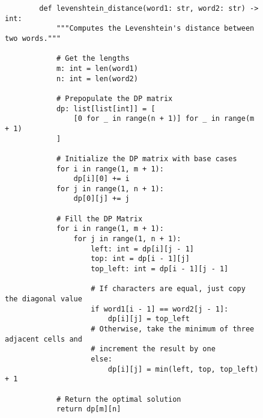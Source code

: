 \begin{figure}[H]
    \centering
    \begin{verbatim}
        def levenshtein_distance(word1: str, word2: str) -> int:
            """Computes the Levenshtein's distance between two words."""

            # Get the lengths
            m: int = len(word1)
            n: int = len(word2)

            # Prepopulate the DP matrix
            dp: list[list[int]] = [
                [0 for _ in range(n + 1)] for _ in range(m + 1)
            ]

            # Initialize the DP matrix with base cases
            for i in range(1, m + 1):
                dp[i][0] += i
            for j in range(1, n + 1):
                dp[0][j] += j

            # Fill the DP Matrix
            for i in range(1, m + 1):
                for j in range(1, n + 1):
                    left: int = dp[i][j - 1]
                    top: int = dp[i - 1][j]
                    top_left: int = dp[i - 1][j - 1]

                    # If characters are equal, just copy the diagonal value
                    if word1[i - 1] == word2[j - 1]:
                        dp[i][j] = top_left
                    # Otherwise, take the minimum of three adjacent cells and
                    # increment the result by one
                    else:
                        dp[i][j] = min(left, top, top_left) + 1

            # Return the optimal solution
            return dp[m][n]
    \end{verbatim}
\end{figure}
